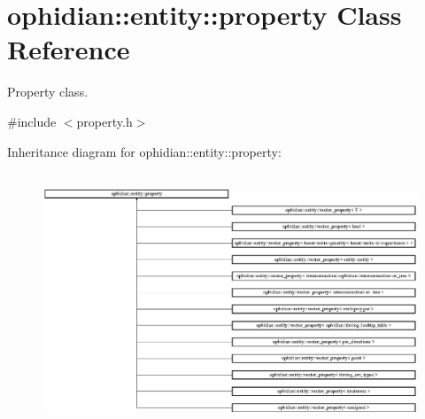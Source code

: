 \hypertarget{classophidian_1_1entity_1_1property}{\section{ophidian\-:\-:entity\-:\-:property Class Reference}
\label{classophidian_1_1entity_1_1property}
}


Property class.  




{\ttfamily \#include $<$property.\-h$>$}

Inheritance diagram for ophidian\-:\-:entity\-:\-:property\-:\begin{figure}[H]
\begin{center}
\leavevmode
\includegraphics[height=7.656250cm]{classophidian_1_1entity_1_1property}
\end{center}
\end{figure}
